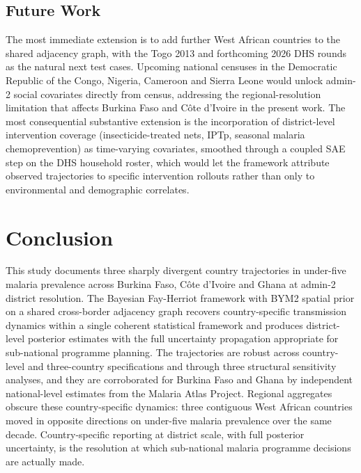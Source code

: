 \documentclass{article}
\begin{document}
\subsection{Future Work}\label{future-work}

The most immediate extension is to add further West African countries to
the shared adjacency graph, with the Togo 2013 and forthcoming 2026 DHS
rounds as the natural next test cases. Upcoming national censuses in the
Democratic Republic of the Congo, Nigeria, Cameroon and Sierra Leone
would unlock admin-2 social covariates directly from census, addressing
the regional-resolution limitation that affects Burkina Faso and Côte
d'Ivoire in the present work. The most consequential substantive
extension is the incorporation of district-level intervention coverage
(insecticide-treated nets, IPTp, seasonal malaria chemoprevention) as
time-varying covariates, smoothed through a coupled SAE step on the DHS
household roster, which would let the framework attribute observed
trajectories to specific intervention rollouts rather than only to
environmental and demographic correlates.

\section{Conclusion}\label{conclusion}

\label{sec:conclusion}

This study documents three sharply divergent country trajectories in
under-five malaria prevalence across Burkina Faso, Côte d'Ivoire and
Ghana at admin-2 district resolution. The Bayesian Fay-Herriot framework
with BYM2 spatial prior on a shared cross-border adjacency graph
recovers country-specific transmission dynamics within a single coherent
statistical framework and produces district-level posterior estimates
with the full uncertainty propagation appropriate for sub-national
programme planning. The trajectories are robust across country-level and
three-country specifications and through three structural sensitivity
analyses, and they are corroborated for Burkina Faso and Ghana by
independent national-level estimates from the Malaria Atlas Project.
Regional aggregates obscure these country-specific dynamics: three
contiguous West African countries moved in opposite directions on
under-five malaria prevalence over the same decade. Country-specific
reporting at district scale, with full posterior uncertainty, is the
resolution at which sub-national malaria programme decisions are
actually made.
\end{document}
